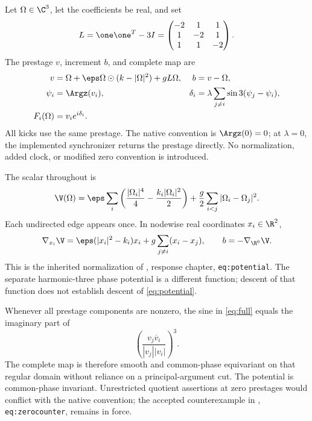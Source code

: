 Let \(\Omega\in\C^3\), let the coefficients be real, and set
\begin{equation}
L=\one\one^T-3I=
\begin{pmatrix}-2&1&1\\1&-2&1\\1&1&-2\end{pmatrix}.
\end{equation}
The prestage \(v\), increment \(b\), and complete map are
\begin{align}
v&=\Omega+\eps\Omega\odot(k-|\Omega|^2)+gL\Omega,
&b&=v-\Omega,\label{eq:pre}\\
\psi_i&=\Argz(v_i),&
\delta_i&=\lambda\sum_{j\ne i}\sin3(\psi_j-\psi_i),\notag\\
F_i(\Omega)&=v_i e^{i\delta_i}.\label{eq:full}
\end{align}
All kicks use the same prestage. The native convention is \(\Argz(0)=0\); at \(\lambda=0\), the implemented synchronizer returns the prestage directly. No normalization, added clock, or modified zero convention is introduced.

The scalar throughout is
\begin{equation}
\V(\Omega)=\eps\sum_i\left(\frac{|\Omega_i|^4}{4}
-\frac{k_i|\Omega_i|^2}{2}\right)
+\frac g2\sum_{i<j}|\Omega_i-\Omega_j|^2.
\label{eq:potential}
\end{equation}
Each undirected edge appears once. In nodewise real coordinates \(x_i\in\R^2\),
\begin{equation}
\nabla_{x_i}\V=\eps(|x_i|^2-k_i)x_i
+g\sum_{j\ne i}(x_i-x_j),\qquad
b=-\nabla_{\R^6}\V.
\label{eq:gradient}
\end{equation}
This is the inherited normalization of \cite{nrg}, response chapter, \texttt{eq:potential}. The separate harmonic-three phase potential is a different function; descent of that function does not establish descent of \eqref{eq:potential}.

Whenever all prestage components are nonzero, the sine in \eqref{eq:full} equals the imaginary part of
\[
\left(\frac{v_j\overline v_i}{|v_j||v_i|}\right)^3.
\]
The complete map is therefore smooth and common-phase equivariant on that regular domain without reliance on a principal-argument cut. The potential is common-phase invariant. Unrestricted quotient assertions at zero prestages would conflict with the native convention; the accepted counterexample in \cite{nrg}, \texttt{eq:zerocounter}, remains in force.

